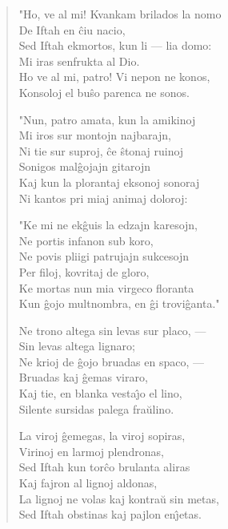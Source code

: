 \begin{verse}
                  "Ho, ve al mi! Kvankam brilados la nomo\\
                   \vin     De Iftah en \^ciu nacio,\\
                  Sed Iftah ekmortos, kun li --- lia domo:\\
                   \vin     Mi iras senfrukta al Dio.\\
                  Ho ve al mi, patro! Vi nepon ne konos,\\
                  Konsoloj el bu\^so parenca ne sonos.

                  "Nun, patro amata, kun la amikinoj\\
                   \vin     Mi iros sur montojn najbarajn,\\
                  Ni tie sur suproj, \^ce \^stonaj ruinoj\\
                   \vin     Sonigos mal\^gojajn gitarojn\\
                  Kaj kun la plorantaj eksonoj sonoraj\\
                  Ni kantos pri miaj animaj doloroj:

                  "Ke mi ne ek\^guis la edzajn karesojn,\\
                   \vin     Ne portis infanon sub koro,\\
                  Ne povis pliigi patrujajn sukcesojn\\
                   \vin     Per filoj, kovritaj de gloro,\\
                  Ke mortas nun mia virgeco floranta\\
                  Kun \^gojo multnombra, en \^gi trovi\^ganta."

                  Ne trono altega sin levas sur placo, ---\\
                   \vin     Sin levas altega lignaro;\\
                  Ne krioj de \^gojo bruadas en spaco, ---\\
                   \vin     Bruadas kaj \^gemas viraro,\\
                  Kaj tie, en blanka vesta\^{\j}o el lino,\\
                  Silente sursidas palega fra\u ulino.

                  La viroj \^gemegas, la viroj sopiras,\\
                   \vin     Virinoj en larmoj plendronas,\\
                  Sed Iftah kun tor\^co brulanta aliras\\
                   \vin     Kaj fajron al lignoj aldonas,\\
                  La lignoj ne volas kaj kontra\u u sin metas,\\
                  Sed Iftah obstinas kaj pajlon en\^{\j}etas.


\end{verse}
